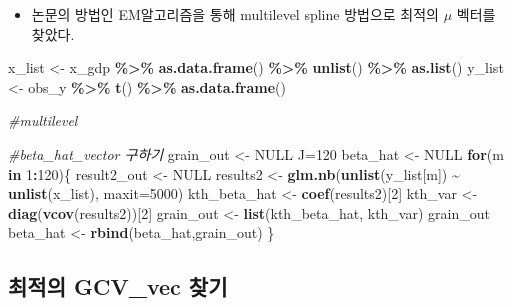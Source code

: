 \documentclass[
]{article}
\newenvironment{Shaded}{\begin{snugshade}}{\end{snugshade}}
\newcommand{\CommentTok}[1]{\textcolor[rgb]{0.56,0.35,0.01}{\textit{#1}}}
\newcommand{\ControlFlowTok}[1]{\textcolor[rgb]{0.13,0.29,0.53}{\textbf{#1}}}
\newcommand{\DataTypeTok}[1]{\textcolor[rgb]{0.13,0.29,0.53}{#1}}
\newcommand{\DecValTok}[1]{\textcolor[rgb]{0.00,0.00,0.81}{#1}}
\newcommand{\KeywordTok}[1]{\textcolor[rgb]{0.13,0.29,0.53}{\textbf{#1}}}
\newcommand{\NormalTok}[1]{#1}
\newcommand{\OperatorTok}[1]{\textcolor[rgb]{0.81,0.36,0.00}{\textbf{#1}}}
\newcommand{\OtherTok}[1]{\textcolor[rgb]{0.56,0.35,0.01}{#1}}
\newcommand{\StringTok}[1]{\textcolor[rgb]{0.31,0.60,0.02}{#1}}
\providecommand{\tightlist}{%
  \setlength{\itemsep}{0pt}\setlength{\parskip}{0pt}}
\begin{document}
\begin{itemize}
\tightlist
\item
  논문의 방법인 EM알고리즘을 통해 multilevel spline 방법으로 최적의 \(\mu\) 벡터를 찾았다.
\end{itemize}

\begin{Shaded}
\begin{Highlighting}[]
\NormalTok{x\_list \textless{}{-}}\StringTok{ }\NormalTok{x\_gdp }\OperatorTok{\%\textgreater{}\%}\StringTok{ }\KeywordTok{as.data.frame}\NormalTok{() }\OperatorTok{\%\textgreater{}\%}\StringTok{ }\KeywordTok{unlist}\NormalTok{() }\OperatorTok{\%\textgreater{}\%}\StringTok{ }\KeywordTok{as.list}\NormalTok{()}
\NormalTok{y\_list \textless{}{-}}\StringTok{ }\NormalTok{obs\_y }\OperatorTok{\%\textgreater{}\%}\StringTok{ }\KeywordTok{t}\NormalTok{() }\OperatorTok{\%\textgreater{}\%}\StringTok{ }\KeywordTok{as.data.frame}\NormalTok{()}

\CommentTok{\#multilevel}

  \CommentTok{\#beta\_hat\_vector 구하기}
\NormalTok{  grain\_out \textless{}{-}}\StringTok{ }\OtherTok{NULL}
\NormalTok{  J=}\DecValTok{120}
\NormalTok{  beta\_hat \textless{}{-}}\StringTok{ }\OtherTok{NULL}
  \ControlFlowTok{for}\NormalTok{(m }\ControlFlowTok{in} \DecValTok{1}\OperatorTok{:}\DecValTok{120}\NormalTok{)\{}
\NormalTok{    result2\_out \textless{}{-}}\StringTok{ }\OtherTok{NULL}
\NormalTok{    results2 \textless{}{-}}\StringTok{ }\KeywordTok{glm.nb}\NormalTok{(}\KeywordTok{unlist}\NormalTok{(y\_list[m]) }\OperatorTok{\textasciitilde{}}\StringTok{ }\KeywordTok{unlist}\NormalTok{(x\_list), }\DataTypeTok{maxit=}\DecValTok{5000}\NormalTok{)}
\NormalTok{      kth\_beta\_hat \textless{}{-}}\StringTok{ }\KeywordTok{coef}\NormalTok{(results2)[}\DecValTok{2}\NormalTok{]}
\NormalTok{      kth\_var \textless{}{-}}\StringTok{ }\KeywordTok{diag}\NormalTok{(}\KeywordTok{vcov}\NormalTok{(results2))[}\DecValTok{2}\NormalTok{]}
\NormalTok{      grain\_out \textless{}{-}}\StringTok{ }\KeywordTok{list}\NormalTok{(kth\_beta\_hat, kth\_var)}
\NormalTok{      grain\_out}
\NormalTok{    beta\_hat \textless{}{-}}\StringTok{ }\KeywordTok{rbind}\NormalTok{(beta\_hat,grain\_out)}
\NormalTok{  \}}
\end{Highlighting}
\end{Shaded}

\hypertarget{uxcd5cuxc801uxc758-gcv_vec-uxcc3euxae30}{%
\subsection{최적의 GCV\_vec 찾기}\label{uxcd5cuxc801uxc758-gcv_vec-uxcc3euxae30}}
\end{document}
